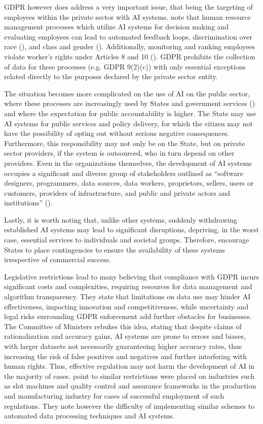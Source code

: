 \documentclass{article}
\begin{document}
GDPR however does address a very important issue, that being the targeting of employees within the private sector with AI systems. \cite{wagner2018} note that human resource management processes which utilize AI systems for decision making and evaluating employees can lead to automated feedback loops, discrimination over race (\cite{bertrand2003}), and class and gender (\cite{ALTONJI19993143, Goldin1999OrchestratingI}). Additionally, monitoring and ranking employees violate worker's rights under Articles 8 and 10 (\cite{Voorhoof2013TheRT}). GDPR prohibits the collection of data for these processes (e.g. GDPR 9(2)(c)) with only essential exceptions related directly to the purposes declared by the private sector entity.

The situation becomes more complicated on the use of AI on the public sector, where these processes are increasingly used by States and government services (\cite{vanhaastert2016government}) and where the expectation for public accountability is higher. The State may use AI systems for public services and policy delivery, for which the citizen may not have the possibility of opting out without serious negative consequences. Furthermore, this responsibility may not only be on the State, but on private sector providers, if the system is outsourced, who in turn depend on other providers. Even in the organizations themselves, the development of AI systems occupies a significant and diverse group of stakeholders outlined as “software designers, programmers, data sources, data workers, proprietors, sellers, users or customers, providers of infrastructure, and public and private actors and institutions” (\cite{cmrec2020}).

Lastly, it is worth noting that, unlike other systems, suddenly withdrawing established AI systems may lead to significant disruptions, depriving, in the worst case, essential services to individuals and societal groups. Therefore, \cite{cmrec2020} encourage States to place contingencies to ensure the availability of these systems irrespective of commercial success.

Legislative restrictions lead to many believing that compliance with GDPR incurs significant costs and complexities, requiring resources for data management and algorithm transparency. They state that limitations on data use may hinder AI effectiveness, impacting innovation and competitiveness, while uncertainty and legal risks surrounding GDPR enforcement add further obstacles for businesses. The Committee of Ministers \cite{cmrec2020} rebukes this idea, stating that despite claims of rationalization and accuracy gains, AI systems are prone to errors and biases, with larger datasets not necessarily guaranteeing higher accuracy rates, thus increasing the risk of false positives and negatives and further interfering with human rights. Thus, effective regulation may not harm the development of AI in the majority of cases. \cite{wagner2018} point to similar restrictions were placed on industries such as slot machines and quality control and assurance frameworks in the production and manufacturing industry for cases of successful employment of such regulations. They note however the difficulty of implementing similar schemes to automated data processing techniques and AI systems.
\end{document}
